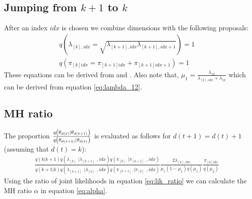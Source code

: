 \documentclass{article}
\begin{document}
\subsection{Jumping from $k+1$ to $k$}
After an index $idx$ is chosen we combine dimensions with the following proposals:
\begin{align}
q(\lambda_{[k],idx}=\sqrt{\lambda_{[k+1],idx}\lambda_{[k+1],idx+1}})=1\\
q(\pi_{[k]idx}=\pi_{[k+1]idx}+\pi_{[k+1]idx+1})=1
\end{align}
These equations can be derived from  and . Also note that, $\mu_1=\frac{\lambda_{12}}{\lambda_{[k],idx}+\lambda_{12}}$ which can be derived from equation \ref{eq:lambda_12}.

%
%

\subsection{MH ratio}
The proportion $\frac{q\left(\theta_{d(t)}|\theta_{d(t+1)}\right)}{q\left(\theta_{d(t+1)}|\theta_{d(t)}\right)}$ is evaluated as follows for $d(t+1)=d(t)+1$ (assuming that $d(t)=k$):
\begin{align}
\frac{q(k|k+1)q(\lambda_{[k]\cdot}|\lambda_{[k+1]\cdot}, idx)q(\pi_{[k]\cdot}|\pi_{[k+1]\cdot}, idx)}{q(k+1|k)q(\lambda_{[k+1]\cdot}|\lambda_{[k]\cdot}, idx)q(\pi_{[k+1]\cdot}|\pi_{[k]\cdot}, idx)}\frac{2\lambda_{[k],idx}}{\mu_1(1-\mu_1)q(\mu_1)}\frac{\pi_{[k]idx}}{q(\mu_2)}
\end{align}
Using the ratio of joint likelihoods in equation \ref{eq:lik_ratio} we can calculate the MH ratio $\alpha$ in equation \ref{eq:alpha}.
\end{document}
